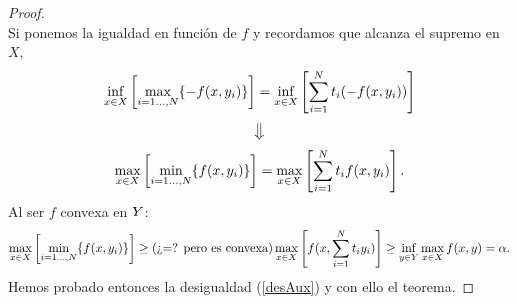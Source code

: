 \begin{proof}
\[\] 
Si ponemos la igualdad en función de $ f $ y recordamos que alcanza el supremo en $ X $,
\[
\inf_{x \in X}\left[ \max_{i=1\dots,N } \{-f(x,y_i)\}\right] = \inf_{x \in X} \left[ \sum_{i=1}^{N} t_i (-f(x,y_i)) \right]
\] 
\[
\big\Downarrow
\]
\[
\max_{x \in X}\left[ \min_{i=1\dots,N } \{f(x,y_i)\}\right] = \max_{x \in X} \left[ \sum_{i=1}^{N} t_i f(x,y_i) \right]. 
\] 
Al ser $ f $ convexa en $ Y $:
\[
\max_{x \in X}\left[ \min_{i=1\dots,N } \{f(x,y_i)\}\right] \geq \text{(¿=? pero es convexa)}\max_{x \in X} \left[ f(x,\sum_{i=1}^{N} t_i y_i) \right] \geq \inf_{y \in Y} \max_{x \in X} f(x,y)= \alpha.
\]
Hemos probado entonces la desigualdad (\ref{desAux}) y con ello el teorema.
\end{proof}
